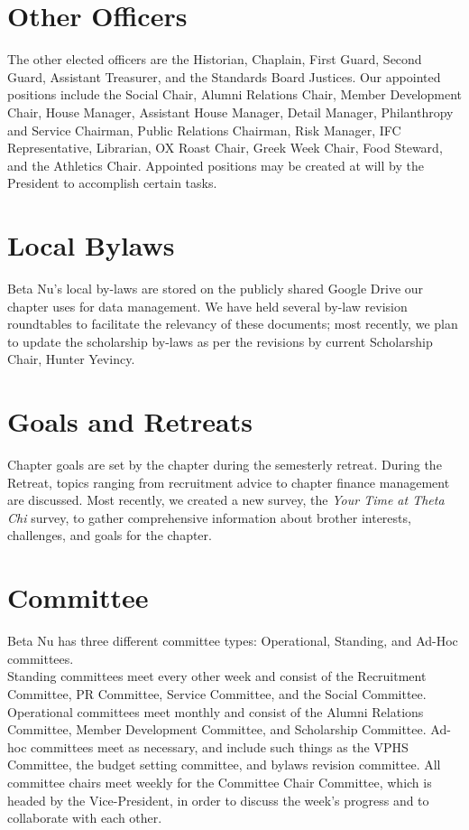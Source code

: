     \section*{Other Officers}
	The other elected officers are the Historian, Chaplain, First Guard, Second Guard, Assistant Treasurer, and the Standards Board Justices. Our appointed positions include the Social Chair, Alumni Relations Chair, Member Development Chair, House Manager, Assistant House Manager, Detail Manager, Philanthropy and Service Chairman, Public Relations Chairman, Risk Manager, IFC Representative, Librarian, OX Roast Chair, Greek Week Chair, Food Steward, and the Athletics Chair. Appointed positions may be created at will by the President to accomplish certain tasks.
	
    \section*{Local Bylaws}
	Beta Nu's local by-laws are stored on the publicly shared Google Drive our chapter uses for data management. We have held several by-law revision roundtables to facilitate the relevancy of these documents; most recently, we plan to update the scholarship by-laws as per the revisions by current Scholarship Chair, Hunter Yevincy. 
	
    \section*{Goals and Retreats}
	Chapter goals are set by the chapter during the semesterly retreat. During the Retreat, topics ranging from recruitment advice to chapter finance management are discussed. Most recently, we created a new survey, the \textit{Your Time at Theta Chi} survey, to gather comprehensive information about brother interests, challenges, and goals for the chapter.
	
    \section*{Committee}
	Beta Nu has three different committee types: Operational, Standing, and Ad-Hoc committees. \\
	
	Standing committees meet every other week and consist of the Recruitment Committee, PR Committee, Service Committee, and the Social Committee. Operational committees meet monthly and consist of the Alumni Relations Committee, Member Development Committee, and Scholarship Committee. Ad-hoc committees meet as necessary, and include such things as the VPHS Committee, the budget setting committee, and bylaws revision committee. All committee chairs meet weekly for the Committee Chair Committee, which is headed by the Vice-President, in order to discuss the week’s progress and to collaborate with each other.
	
